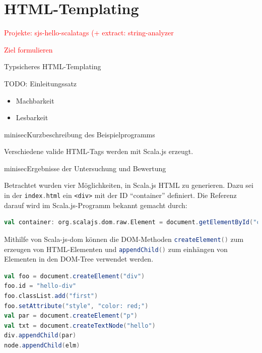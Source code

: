 \documentclass[a4paper, 12pt, hidelinks, listof=totoc, listoftables=totoc, bibliography=totoc]{scrreprt}
\newcommand{\code}[1]{\lstinline[language=Scala, style=inline]|#1|}
\newcommand{\scala}[1]{\lstinline[language=Scala, style=inline]|#1|}
\newcommand{\html}[1]{\lstinline[language=HTML5, style=inline]|#1|}
\newcommand{\TODO}[1]{\textcolor{red}{#1}\newline}
\begin{document}
\section{HTML-Templating}


\TODO{Projekte: sjs-hello-scalatags (+ extract: string-analyzer}


\TODO{Ziel formulieren}

Typsicheres \ac{HTML}-Templating 

TODO: Einleitungssatz


\begin{itemize}
	\item Machbarkeit
	\item Lesbarkeit
\end{itemize}

minisec{Kurzbeschreibung des Beispielprogramms}

Verschiedene valide \ac{HTML}-Tags werden mit Scala.js erzeugt.

minisec{Ergebnisse der Untersuchung und Bewertung}

Betrachtet wurden vier Möglichkeiten, in Scala.js \ac{HTML} zu generieren. Dazu sei in der \code{index.html} ein
\html{<div>} mit der ID "`container"' definiert. Die Referenz darauf wird im Scala.js-Programm bekannt gemacht durch:

\begin{lstlisting}[language=Scala, style=snippet]
val container: org.scalajs.dom.raw.Element = document.getElementById("container")
\end{lstlisting}

Mithilfe von Scala-js-dom können die \ac{DOM}-Methoden \scala{createElement()} zum erzeugen von \ac{HTML}-Elementen und \scala{appendChild()} zum einhängen von Elementen in den DOM-Tree verwendet werden.

\begin{lstlisting}[language=Scala, caption={HTML-Generierung mit Scala-js-dom und Nodes.}]
val foo = document.createElement("div")
foo.id = "hello-div"
foo.classList.add("first")
foo.setAttribute("style", "color: red;")
val par = document.createElement("p")
val txt = document.createTextNode("hello")
div.appendChild(par)
node.appendChild(elm)
\end{lstlisting}
\end{document}
